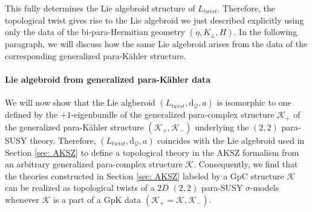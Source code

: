 \documentclass[letterpaper,12pt]{article}
\newcommand{\KK}{\mathcal{K}}
\newcommand{\QQ}{\mathcal{Q}}
\newcommand{\rd}{\mathrm{d}}
\newcommand{\Lb}{\mathbb{L}}
\theoremstyle{definition}
\theoremstyle{remark}
\theoremstyle{examples}
\def\brian{\textcolor{blue}{BM: }\textcolor{blue}}
\def\btd{\textcolor{orange}{BM to DB: }\textcolor{orange}}
\begin{document}
This fully determines the Lie algebroid structure of $L_{twist}$. Therefore, the topological twist gives rise to the Lie algebroid we just described explicitly using only the data of the bi-para-Hermitian geometry $(\eta,K_\pm,H)$. In the following paragraph, we will discuss how the same Lie algebroid arises from the data of the corresponding generalized para-K\"ahler structure.

\paragraph{Lie algebroid from generalized para-K\"ahler data}
%
We will now show that the Lie algberoid $(L_{twist},\rd_\QQ,a)$ is isomorphic to one defined by the $+1$-eigenbundle of the generalized para-complex structure $\KK_+$ of the generalized para-K\"ahler structure $(\KK_+,\KK_-)$ underlying the $(2,2)$ para-SUSY theory. Therefore, $(L_{twist},\rd_\QQ,a)$ coincides with the Lie algebroid used in Section \ref{sec: AKSZ} to define a topological theory in the AKSZ formalism from an arbitrary generalized para-complex structure $\KK$. Consequently, we find that the theories constructed in Section \ref{sec: AKSZ} labeled by a GpC structure $\KK$ can be realized as topological twists of a $2D$ $(2,2)$ para-SUSY $\sigma$-models whenever $\KK$ is a part of a GpK data $(\KK_+=\KK,\KK_-)$.
\end{document}
